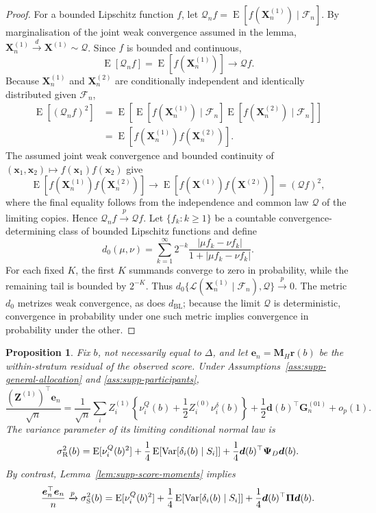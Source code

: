 \documentclass[12pt,a4paper]{article}
\newtheorem{proposition}{Proposition}
\theoremstyle{definition}
\theoremstyle{remark}\newtheorem{remark}{Remark}
\numberwithin{equation}{section}
\newcommand{\E}{\operatorname{E}}
\newcommand{\Var}{\operatorname{Var}}
\begin{document}
\begin{proof}
For a bounded Lipschitz function $f$, let $\mathcal Q_nf=\E[f(\bm X_n^{(1)})\mid\mathcal F_n]$. By marginalisation of the joint weak convergence assumed in the lemma, $\bm X_n^{(1)}\xrightarrow{d}\bm X^{(1)}\sim\mathcal Q$. Since $f$ is bounded and continuous,
\[
\E[\mathcal Q_nf]
=
\E[f(\bm X_n^{(1)})]
\longrightarrow
\mathcal Qf.
\]
Because $\bm X_n^{(1)}$ and $\bm X_n^{(2)}$ are conditionally independent and identically distributed given $\mathcal F_n$,
\[
\begin{aligned}
\E[(\mathcal Q_nf)^2]
&=
\E\left[
\E[f(\bm X_n^{(1)})\mid\mathcal F_n]
\E[f(\bm X_n^{(2)})\mid\mathcal F_n]
\right]\\
&=
\E[f(\bm X_n^{(1)})f(\bm X_n^{(2)})].
\end{aligned}
\]
The assumed joint weak convergence and bounded continuity of $(\bm x_1,\bm x_2)\mapsto f(\bm x_1)f(\bm x_2)$ give
\[
\E[f(\bm X_n^{(1)})f(\bm X_n^{(2)})]
\longrightarrow
\E[f(\bm X^{(1)})f(\bm X^{(2)})]
=
(\mathcal Qf)^2,
\]
where the final equality follows from the independence and common law $\mathcal Q$ of the limiting copies. Hence $\mathcal Q_nf\xrightarrow{p}\mathcal Qf$. Let $\{f_k:k\ge1\}$ be a countable convergence-determining class of bounded Lipschitz functions and define
\[
d_0(\mu,\nu)=\sum_{k=1}^\infty 2^{-k}
\frac{|\mu f_k-\nu f_k|}{1+|\mu f_k-\nu f_k|}.
\]
For each fixed $K$, the first $K$ summands converge to zero in probability, while the remaining tail is bounded by $2^{-K}$. Thus $d_0\{\mathcal L(\bm X_n^{(1)}\mid\mathcal F_n),\mathcal Q\}\xrightarrow{p}0$. The metric $d_0$ metrizes weak convergence, as does $d_{\mathrm{BL}}$; because the limit $\mathcal Q$ is deterministic, convergence in probability under one such metric implies convergence in probability under the other.
\end{proof}
\begin{proposition}\label{prop:supp-randomization-residual}
Fix $b$, not necessarily equal to $\Delta$, and let $\bm e_n=\bm M_H\bm r(b)$ be the within-stratum residual of the observed score. Under Assumptions~\ref{ass:supp-general-allocation} and \ref{ass:supp-participants},
\begin{equation}\label{eq:supp-regenerated-expansion}
\frac{(\bm Z^{(1)})^\top\bm e_n}{\sqrt n}
=
\frac1{\sqrt n}\sum_iZ_i^{(1)}
\left\{\nu_i^Q(b)+\frac12Z_i^{(0)}\nu_i^\delta(b)\right\}
+\frac12\bm d(b)^\top\bm G_n^{(01)}
+o_p(1).
\end{equation}
The variance parameter of its limiting conditional normal law is
\begin{equation}\label{eq:supp-sigmaR}
\sigma_{\rm R}^2(b)
=\E[\nu_i^Q(b)^2]
+\frac14\E[\Var[\delta_i(b)\mid S_i]]
+\frac14\bm d(b)^\top\bm\Psi_D\bm d(b).
\end{equation}
By contrast, Lemma~\ref{lem:supp-score-moments} implies
\begin{equation}\label{eq:supp-sigmaS}
\frac{\bm e_n^\top\bm e_n}{n}
\xrightarrow{p}
\sigma_{\rm S}^2(b)
=\E[\nu_i^Q(b)^2]
+\frac14\E[\Var[\delta_i(b)\mid S_i]]
+\frac14\bm d(b)^\top\bm\Pi\bm d(b).
\end{equation}
\end{proposition}
\end{document}
